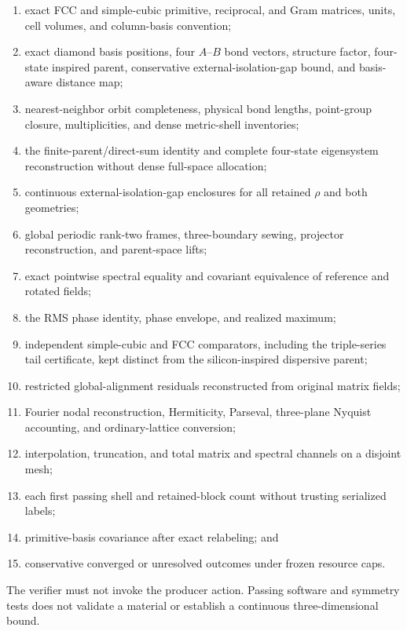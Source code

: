 \documentclass[11pt]{article}
\begin{document}
\begin{enumerate}[label=\arabic*.]
 \item exact FCC and simple-cubic primitive, reciprocal, and Gram matrices, units, cell
       volumes, and column-basis convention;
 \item exact diamond basis positions, four $A$--$B$ bond vectors, structure factor,
       four-state inspired parent, conservative external-isolation-gap bound, and basis-aware
       distance map;
 \item nearest-neighbor orbit completeness, physical bond lengths, point-group closure,
       multiplicities, and dense metric-shell inventories;
 \item the finite-parent/direct-sum identity and complete four-state eigensystem
       reconstruction without dense full-space allocation;
 \item continuous external-isolation-gap enclosures for all retained $\rho$ and both geometries;
 \item global periodic rank-two frames, three-boundary sewing, projector reconstruction,
       and parent-space lifts;
 \item exact pointwise spectral equality and covariant equivalence of reference and
       rotated fields;
 \item the RMS phase identity, phase envelope, and realized maximum;
 \item independent simple-cubic and FCC comparators, including the triple-series tail
       certificate, kept distinct from the silicon-inspired dispersive parent;
 \item restricted global-alignment residuals reconstructed from original matrix fields;
 \item Fourier nodal reconstruction, Hermiticity, Parseval, three-plane Nyquist
       accounting, and ordinary-lattice conversion;
 \item interpolation, truncation, and total matrix and spectral channels on a disjoint
       mesh;
 \item each first passing shell and retained-block count without trusting serialized
       labels;
 \item primitive-basis covariance after exact relabeling; and
 \item conservative converged or unresolved outcomes under frozen resource caps.
\end{enumerate}
The verifier must not invoke the producer action.  Passing software and symmetry tests
does not validate a material or establish a continuous three-dimensional bound.
\end{document}
